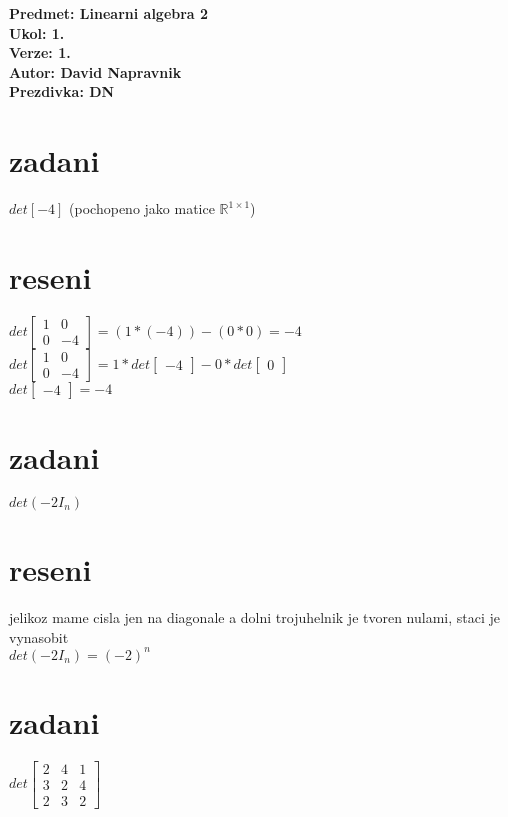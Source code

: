 \documentclass[a4paper]{article}
\begin{document}
\noindent
\textbf{Predmet: Linearni algebra 2}\\
\textbf{Ukol: 1.}\\
\textbf{Verze: 1.}\\
\textbf{Autor: David Napravnik}\\
\textbf{Prezdivka: DN}

\section*{zadani}
$det[-4]$ (pochopeno jako matice $\mathbb{R}^{1\times1}$)

\section*{reseni}
$
	det \left[ \begin{matrix} 1 & 0 \\ 0 & -4 \end{matrix} \right] =
	(1*(-4)) - (0*0) = -4
$\\
$
	det \left[ \begin{matrix} 1 & 0 \\ 0 & -4 \end{matrix} \right]=
	1 * det \left[ \begin{matrix} -4 \end{matrix} \right] -
	0 * det \left[ \begin{matrix} 0 \end{matrix} \right]
$\\
$
	det \left[ \begin{matrix} -4 \end{matrix} \right] = -4
$



\section*{zadani}
$det(-2I_n)$

\section*{reseni}
jelikoz mame cisla jen na diagonale a dolni trojuhelnik je tvoren nulami, staci je vynasobit\\
$det(-2I_n) = (-2)^n$



\section*{zadani}
$
det\left[ \begin{matrix} 2 & 4 & 1 \\ 3 & 2 & 4 \\ 2 & 3 & 2 \end{matrix} \right]
$
\end{document}
